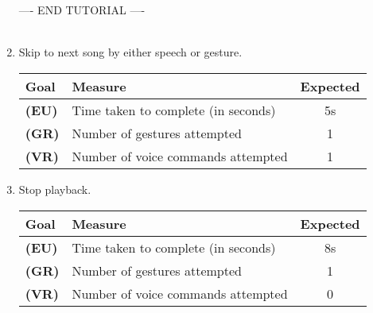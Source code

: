 \documentclass[12pt,letterpaper]{article}
\begin{document}
\begin{enumerate}
 \\ \\---- END TUTORIAL ----\\ \\





\item Skip to next song by either speech or gesture.
\begin{center}\begin{tabular}{l|l|c}
\textbf{Goal} & \textbf{Measure} & \textbf{Expected} \\
\hline
\textbf{(EU)} & Time taken to complete (in seconds) & 5s \\
\hline
\textbf{(GR)} & Number of gestures attempted & 1 \\
\hline
\textbf{(VR)} & Number of voice commands attempted & 1 \\
\hline
\end{tabular}\end{center}

\item Stop playback.
\begin{center}\begin{tabular}{l|l|c}
\textbf{Goal} & \textbf{Measure} & \textbf{Expected} \\
\hline
\textbf{(EU)} & Time taken to complete (in seconds) & 8s \\
\hline
\textbf{(GR)} & Number of gestures attempted & 1 \\
\hline
\textbf{(VR)} & Number of voice commands attempted & 0 \\
\hline
\end{tabular}\end{center}


\end{enumerate}
\end{document}
